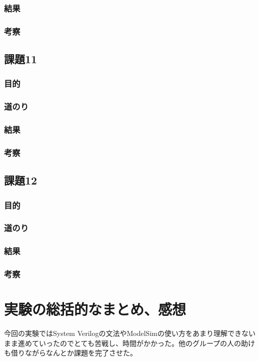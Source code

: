\documentclass[a4paper]{jarticle}
\begin{document}
\subsubsection{結果}
\subsubsection{考察}
\subsection{課題11}
\subsubsection{目的}
\subsubsection{道のり}
\subsubsection{結果}
\subsubsection{考察}
\subsection{課題12}
\subsubsection{目的}
\subsubsection{道のり}
\subsubsection{結果}
\subsubsection{考察}
\section{実験の総括的なまとめ、感想}
今回の実験ではSystem Verilogの文法やModelSimの使い方をあまり理解できないまま進めていったのでとても苦戦し、時間がかかった。他のグループの人の助けも借りながらなんとか課題を完了させた。
\end{document}
